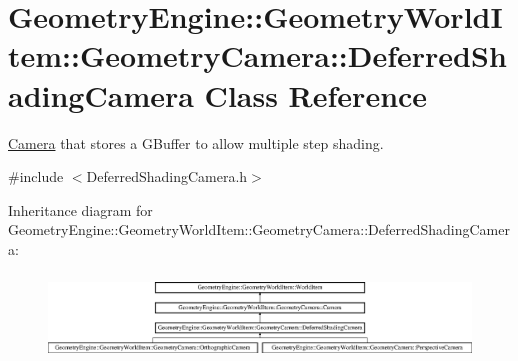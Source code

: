 \hypertarget{class_geometry_engine_1_1_geometry_world_item_1_1_geometry_camera_1_1_deferred_shading_camera}{}\section{Geometry\+Engine\+::Geometry\+World\+Item\+::Geometry\+Camera\+::Deferred\+Shading\+Camera Class Reference}
\label{class_geometry_engine_1_1_geometry_world_item_1_1_geometry_camera_1_1_deferred_shading_camera}


\mbox{\hyperlink{class_geometry_engine_1_1_geometry_world_item_1_1_geometry_camera_1_1_camera}{Camera}} that stores a G\+Buffer to allow multiple step shading.  




{\ttfamily \#include $<$Deferred\+Shading\+Camera.\+h$>$}

Inheritance diagram for Geometry\+Engine\+::Geometry\+World\+Item\+::Geometry\+Camera\+::Deferred\+Shading\+Camera\+:\begin{figure}[H]
\begin{center}
\leavevmode
\includegraphics[height=2.338205cm]{class_geometry_engine_1_1_geometry_world_item_1_1_geometry_camera_1_1_deferred_shading_camera}
\end{center}
\end{figure}
